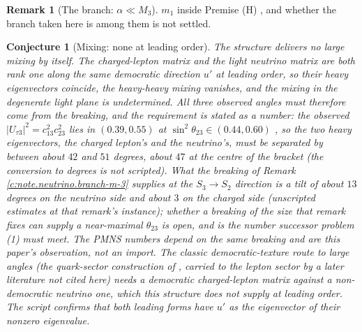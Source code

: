 \documentclass[11pt]{article}
\newtheorem{conjecture}[theorem]{Conjecture}
\theoremstyle{definition}
\newtheorem{remark}[theorem]{Remark}
\theoremstyle{plain}
\begin{document}
\begin{remark}[The branch: $\alpha \ll M_{3}$]
$m_{1}$ inside Premise (H) \cite[Obs.~11.7]{ButlerT12}, and whether the branch taken here is among them is not settled.
\end{remark}

\begin{conjecture}[Mixing: none at leading order]\label{c:neutrino.mixing-none-leading-order}
The structure delivers no large mixing by itself. The charged-lepton matrix and the light neutrino matrix are both rank one along the same democratic direction $u'$ at leading order, so their heavy eigenvectors coincide, the heavy-heavy mixing vanishes, and the mixing in the degenerate light plane is undetermined. All three observed angles must therefore come from the breaking, and the requirement is stated as a number: the observed $|U_{\tau 3}|^{2} = c_{13}^{2}c_{23}^{2}$ lies in $(0.39, 0.55)$ at $\sin^{2}\theta_{23} \in (0.44, 0.60)$ \cite{NuFIT2024}, so the two heavy eigenvectors, the charged lepton's and the neutrino's, must be separated by between about $42$ and $51$ degrees, about $47$ at the centre of the bracket (the conversion to degrees is not scripted). What the breaking of Remark \ref{c:note.neutrino.branch-m-3} supplies at the $S_{3} \to S_{2}$ direction is a tilt of about $13$ degrees on the neutrino side and about $3$ on the charged side (unscripted estimates at that remark's instance); whether a breaking of the size that remark fixes can supply a near-maximal $\theta_{23}$ is open, and is the number successor problem (1) must meet. The PMNS numbers depend on the same breaking and are this paper's observation, not an import. The classic democratic-texture route to large angles (the quark-sector construction of \cite{HHW1978}, carried to the lepton sector by a later literature not cited here) needs a democratic charged-lepton matrix against a non-democratic neutrino one, which this structure does not supply at leading order. The script confirms that both leading forms have $u'$ as the eigenvector of their nonzero eigenvalue.
\end{conjecture}
\end{document}
